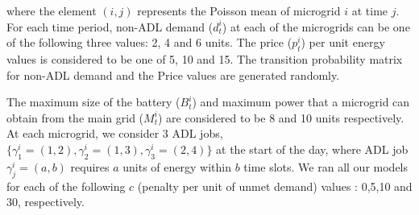 where the element $(i,j)$ represents the Poisson mean of microgrid $i$ at time $j$.
For each time period, non-ADL demand ($d_t^i$) at each of the microgrids can be one of the following  three values: 2, 4 and 6 units. The price ($p_t^i$) per unit energy values is considered to be one of 5, 10 and 15. 
The transition probability matrix for non-ADL demand and the Price values are generated randomly.

%
The maximum size of the battery ($B_t^i$) and maximum power that a microgrid can obtain from the main grid ($M_t^i$) are considered to be 8 and 10 units respectively.
At each microgrid, we consider 3 ADL jobs, $\{\gamma_{1}^{i} =  (1,2), \gamma_{2}^{i} =  (1,3),  \gamma_{3}^{i} =  (2,4)\}$ at the start of the day, where ADL job $\gamma_{j}^{i} =  (a,b)$ requires $a$ units of energy within $b$ time slots. %
We ran all our models for each of the following $c$ (penalty per unit of unmet demand) values : 0,5,10 and 30, respectively.
